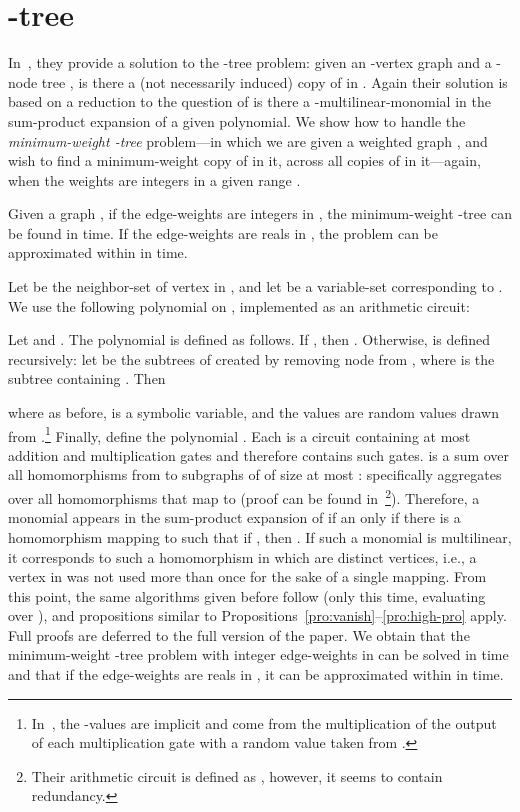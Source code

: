 \documentclass{llncs}
\begin{document}
\section{-tree}\label{sec:tree}
In~\cite{KW09}, they provide a solution to the -tree problem: given an -vertex graph  and a -node tree , is there a (not necessarily induced) copy of  in . Again their solution is based on a reduction to the question of is there a -multilinear-monomial in the sum-product expansion of a given polynomial. We show how to handle the \emph{minimum-weight -tree} problem---in which we are given a weighted graph , and wish to find a minimum-weight copy of  in it, across all copies of  in it---again, when the weights are integers in a given range . 

\begin{theorem}\label{thr:tree}
Given a graph , if the edge-weights are integers in , the minimum-weight -tree can be found in  time. If the edge-weights are reals in , the problem can be approximated within  in  time.
\end{theorem}
Let  be the neighbor-set of vertex  in , and let  be a variable-set corresponding to . We use the following polynomial on , implemented as an arithmetic circuit:

Let  and . The polynomial  is defined as follows. If , then . Otherwise,  is defined recursively:  let  be the subtrees of  created by removing node  from , where  is the subtree containing . Then 

where as before,  is a symbolic variable, and the values  are random values drawn from .\footnote{In~\cite{KW09}, the -values are implicit and come from the multiplication of the output of each multiplication gate with a random value taken from .}
Finally, define the polynomial . Each  is a circuit containing at most  addition and multiplication gates and therefore  contains  such gates. 
 is a sum over all homomorphisms from  to subgraphs of  of size at most : specifically  aggregates over all homomorphisms that map  to  (proof can be found in~\cite{KW09}\footnote{Their arithmetic circuit is defined as , however, it seems to contain redundancy.}). Therefore, a monomial  appears in the sum-product expansion of  if an only if there is a homomorphism mapping  to  such that if , then . If such a monomial is multilinear, it corresponds to such a homomorphism in which  are distinct vertices, i.e., a vertex in  was not used more than once for the sake of a single mapping. From this point, the same algorithms given before follow (only this time, evaluating  over ), and propositions similar to Propositions~\ref{pro:vanish}--\ref{pro:high-pro} apply. Full proofs are deferred to the full version of the paper. We obtain that the minimum-weight -tree problem with integer edge-weights in  can be solved in  time and that if the edge-weights are reals in , it can be approximated within  in  time.
\end{document}
